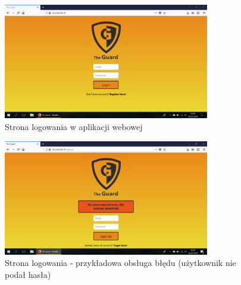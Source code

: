\begin{figure}[ht]
	\centering
	\includegraphics[width=9cm]{web_screenshots/login.png}
	\caption{Strona logowania w aplikacji webowej}
	\label{web_login}
\end{figure}

\begin{figure}[ht]
	\centering
	\includegraphics[width=9cm]{web_screenshots/error.png}
	\caption{Strona logowania - przykładowa obsługa błędu (użytkownik nie podał hasła)}
	\label{web_login_error}
\end{figure}
